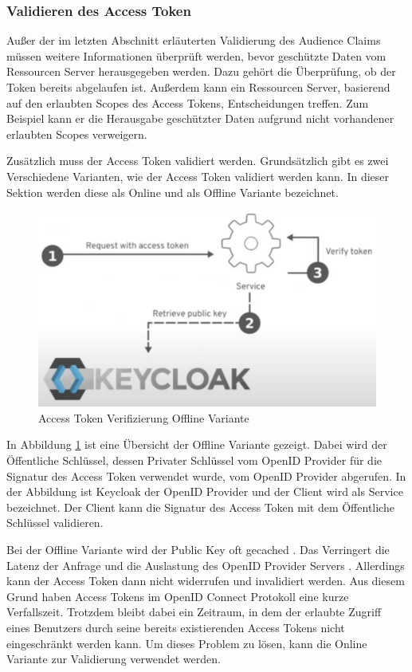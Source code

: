 \subsubsection{Validieren des Access Token}

Außer der im letzten Abschnitt erläuterten Validierung des Audience Claims müssen weitere Informationen überprüft werden, bevor geschützte Daten vom Ressourcen Server herausgegeben werden. Dazu gehört die Überprüfung, ob der Token bereits abgelaufen ist. Außerdem kann ein Ressourcen Server, basierend auf den erlaubten Scopes des Access Tokens, Entscheidungen treffen. Zum Beispiel kann er die Herausgabe geschützter Daten aufgrund nicht vorhandener erlaubten Scopes verweigern.

Zusätzlich muss der Access Token validiert werden. Grundsätzlich gibt es zwei Verschiedene Varianten, wie der Access Token validiert werden kann. In dieser Sektion werden diese als Online und als Offline Variante bezeichnet.

\begin{figure}[!ht]
	\centering
	\includegraphics[width=.8\textwidth]{Images/Ebert/VerifyAccessTokenOffline.PNG}
	\caption{Access Token Verifizierung Offline Variante \cite{EB32}}
	\label{fig:EB_Access Token Verifizierung Offline Variante}
\end{figure}

In Abbildung \ref{fig:EB_Access Token Verifizierung Offline Variante} ist eine Übersicht der Offline Variante gezeigt. Dabei wird der Öffentliche Schlüssel, dessen Privater Schlüssel vom OpenID Provider für die Signatur des Access Token verwendet wurde, vom OpenID Provider abgerufen. In der Abbildung ist Keycloak der OpenID Provider und der Client wird als Service bezeichnet. Der Client kann die Signatur des Access Token mit dem Öffentliche Schlüssel validieren.

Bei der Offline Variante wird der Public Key oft gecached \cite{EB32}. Das Verringert die Latenz der Anfrage und die Auslastung des OpenID Provider Servers \cite{EB32}. Allerdings kann der Access Token dann nicht widerrufen und invalidiert werden. Aus diesem Grund haben Access Tokens im OpenID Connect Protokoll eine kurze Verfallszeit. Trotzdem bleibt dabei ein Zeitraum, in dem der erlaubte Zugriff eines Benutzers durch seine bereits existierenden Access Tokens nicht eingeschränkt werden kann. Um dieses Problem zu lösen, kann die Online Variante zur Validierung verwendet werden. %

